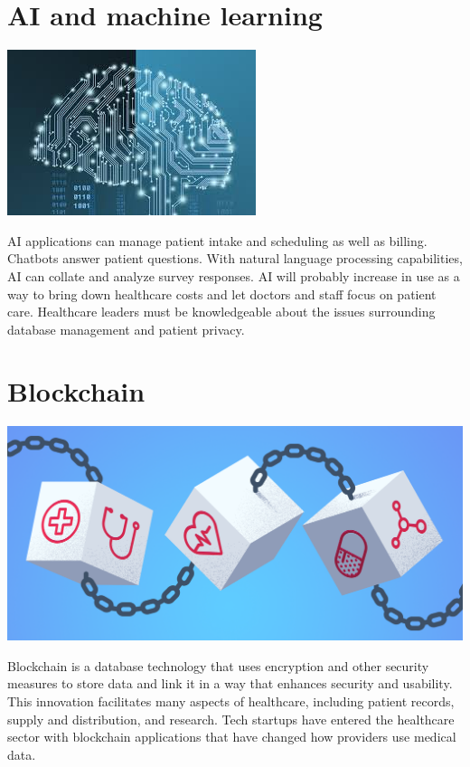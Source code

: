 \documentclass[12pt]{article}
\begin{document}
\section{AI and machine learning}
 \includegraphics[scale=0.8]{ai.jpeg }


AI applications can manage patient intake and scheduling as well as billing. Chatbots answer patient questions. With natural language processing capabilities, AI can collate and analyze survey responses. AI will probably increase in use as a way to bring down healthcare costs and let doctors and staff focus on patient care. Healthcare leaders must be knowledgeable about the issues surrounding database management and patient privacy. 

\section{Blockchain}
 \includegraphics[scale=0.2]{bl.png }

Blockchain is a database technology that uses encryption and other security measures to store data and link it in a way that enhances security and usability. This innovation facilitates many aspects of healthcare, including patient records, supply and distribution, and research. Tech startups have entered the healthcare sector with blockchain applications that have changed how providers use medical data. 
\end{document}
